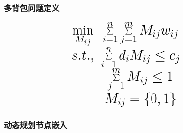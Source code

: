 
\begin{frame}
\frametitle{多背包问题定义}
\begin{equation}
\huge{
\begin{array}{*{20}{c}}
   {\mathop {\min }\limits_{{M_{ij}}} } & {\sum\limits_{i = 1}^n {\sum\limits_{j = 1}^m {{M_{ij}}{w_{ij}}} } }  \\
   {s.t.,} & {\sum\limits_{i = 1}^n {{d_i}{M_{ij}}}  \le {c_j}}  \\
   {} & {\sum\limits_{j = 1}^m {{M_{ij}}}  \le 1}  \\
   {} & {{M_{ij}} = \{ 0,1\} }  \\
\end{array}
}
\label{eq:problem formulation}
\end{equation}
\end{frame}

\subsubsection{动态规划节点嵌入}

